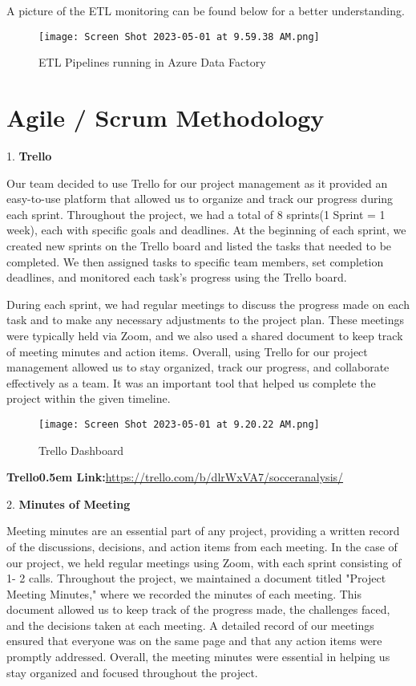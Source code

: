 \documentclass[lettersize]{IEEEtran}
\begin{document}
A picture of the ETL monitoring can be found below for a better understanding.
\begin{figure}[H]
    \centering
    \texttt{[image: Screen Shot 2023-05-01 at 9.59.38 AM.png]}
    \caption{ETL Pipelines running in Azure Data Factory}
    \label{fig:image_label}
\end{figure}

\section{\textbf{Agile / Scrum Methodology}}\vspace{0.4em}
1. \textbf{Trello}\

Our team decided to use Trello for our project management as it provided an easy-to-use platform that allowed us to organize and track our progress during each sprint.
Throughout the project, we had a total of 8 sprints(1 Sprint = 1 week), each with specific goals and deadlines. At the beginning of each sprint, we created new sprints on the Trello board and listed the tasks that needed to be completed. We then assigned tasks to specific team members, set completion deadlines, and monitored each task's progress using the Trello board.\

During each sprint, we had regular meetings to discuss the progress made on each task and to make any necessary adjustments to the project plan. These meetings were typically held via Zoom, and we also used a shared document to keep track of meeting minutes and action items.
Overall, using Trello for our project management allowed us to stay organized, track our progress, and collaborate effectively as a team. It was an important tool that helped us complete the project within the given timeline.\

\begin{figure}[H]
    \centering
    \texttt{[image: Screen Shot 2023-05-01 at 9.20.22 AM.png]}
    \caption{Trello Dashboard}
    \label{fig:image_label}
\end{figure}
\textbf{Trello\kern0.5em Link:}\url{https://trello.com/b/dlrWxVA7/socceranalysis/}

\vspace{1em}
2. \textbf{Minutes of Meeting}\

Meeting minutes are an essential part of any project, providing a written record of the discussions, decisions, and action items from each meeting. In the case of our project, we held regular meetings using Zoom, with each sprint consisting of 1- 2 calls. Throughout the project, we maintained a document titled "Project Meeting Minutes," where we recorded the minutes of each meeting. This document allowed us to keep track of the progress made, the challenges faced, and the decisions taken at each meeting. A detailed record of our meetings ensured that everyone was on the same page and that any action items were promptly addressed. Overall, the meeting minutes were essential in helping us stay organized and focused throughout the project.
\end{document}
